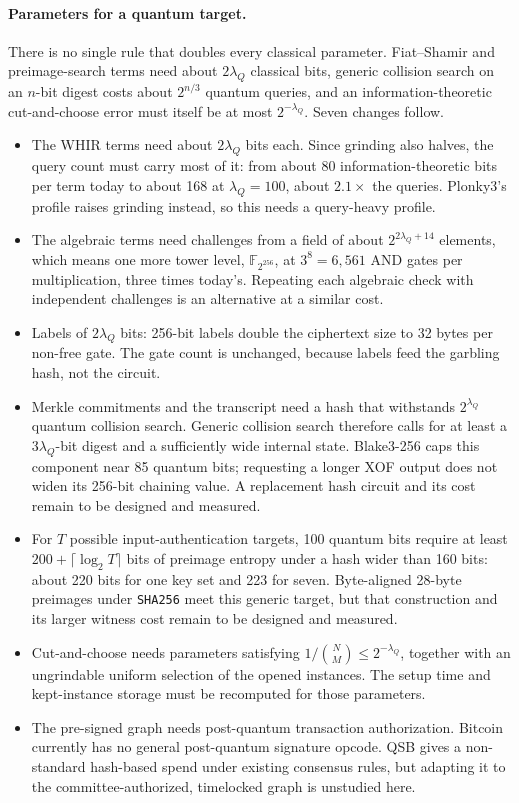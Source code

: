 \documentclass[11pt]{article}
\newcommand{\AND}{\textsf{AND}}
\begin{document}
\paragraph{Parameters for a quantum target.} There is no single rule that
doubles every classical parameter. Fiat--Shamir and preimage-search terms need
about $2\lambda_Q$ classical bits, generic collision search on an $n$-bit digest
costs about $2^{n/3}$ quantum queries, and an information-theoretic
cut-and-choose error must itself be at most $2^{-\lambda_Q}$. Seven changes
follow.
\begin{itemize}
  \item The WHIR terms need about $2\lambda_Q$ bits each. Since grinding also
    halves, the query count must carry most of it: from about 80
    information-theoretic bits per term today to about 168 at $\lambda_Q=100$,
    about $2.1\times$ the queries. Plonky3's profile raises grinding instead,
    so this needs a query-heavy profile.
  \item The algebraic terms need challenges from a field of about
    $2^{2\lambda_Q+14}$ elements, which means one more tower level,
    $\mathbb{F}_{2^{256}}$, at $3^8=6{,}561$ \AND{} gates per multiplication, three
    times today's. Repeating each algebraic check with independent challenges is
    an alternative at a similar cost.
  \item Labels of $2\lambda_Q$ bits: 256-bit labels double the ciphertext size to
    32 bytes per non-free gate. The gate count is unchanged, because labels feed
    the garbling hash, not the circuit.
  \item Merkle commitments and the transcript need a hash that withstands
    $2^{\lambda_Q}$ quantum collision search. Generic collision search therefore
    calls for at least a $3\lambda_Q$-bit digest and a sufficiently wide internal
    state. Blake3-256 caps this component near 85 quantum bits; requesting a
    longer XOF output does not widen its 256-bit chaining value. A replacement
    hash circuit and its cost remain to be designed and measured.
  \item For $T$ possible input-authentication targets, 100 quantum bits require
    at least $200+\lceil\log_2 T\rceil$ bits of preimage entropy under a hash
    wider than 160 bits: about 220 bits for one key set and 223 for seven.
    Byte-aligned 28-byte preimages under \texttt{SHA256} meet this generic
    target, but that construction and its larger witness cost remain to be
    designed and measured.
  \item Cut-and-choose needs parameters satisfying
    $1/\binom{N}{M}\le2^{-\lambda_Q}$, together with an ungrindable uniform
    selection of the opened instances. The setup time and kept-instance storage
    must be recomputed for those parameters.
  \item The pre-signed graph needs post-quantum transaction authorization.
    Bitcoin currently has no general post-quantum signature opcode. QSB gives a
    non-standard hash-based spend under existing consensus rules, but adapting
    it to the committee-authorized, timelocked graph is unstudied here.
\end{itemize}
\end{document}

